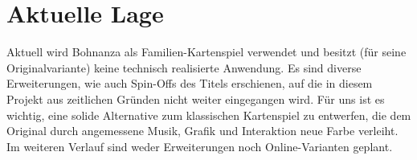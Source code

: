 \section{Aktuelle Lage}

Aktuell wird Bohnanza als Familien-Kartenspiel verwendet und besitzt (für seine Originalvariante) keine technisch realisierte Anwendung. Es sind diverse Erweiterungen, wie auch Spin-Offs des Titels erschienen, auf die in diesem Projekt aus zeitlichen Gründen nicht weiter eingegangen wird. Für uns ist es wichtig, eine solide Alternative zum klassischen Kartenspiel zu entwerfen, die dem Original durch angemessene Musik, Grafik und Interaktion neue Farbe verleiht. \\
Im weiteren Verlauf sind weder Erweiterungen noch Online-Varianten geplant.